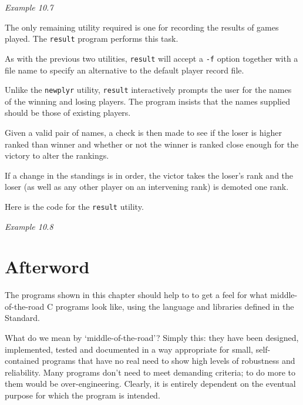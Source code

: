   \begin{center}\textit{Example 10.7}\end{center}


  The only remaining utility required is one for recording the results of
   games played. The \texttt{result} program performs this task.


  As with the previous two utilities, \texttt{result} will accept
   a \texttt{-f} option together with a file name to specify an alternative
   to the default player record file.


  Unlike the \texttt{newplyr} utility, \texttt{result} interactively
   prompts the user for the names of the winning and losing players. The
   program insists that the names supplied should be those of existing
   players.


  Given a valid pair of names, a check is then made to see if the loser is
   higher ranked than winner and whether or not the winner is ranked close
   enough for the victory to alter the rankings.


  If a change in the standings is in order, the victor takes the loser's
   rank and the loser (as well as any other player on an intervening rank) is
   demoted one rank.


  Here is the code for the \texttt{result} utility.


  \begin{center}\textit{Example 10.8}\end{center}

 
 
        \section{Afterword}
        

  

  The programs shown in this chapter should help to to get a feel for
   what middle-of-the-road C programs look like, using the language and
   libraries defined in the Standard.


  What do we mean by `middle-of-the-road'? Simply this: they have
   been designed, implemented, tested and documented in a way appropriate
   for small, self-contained programs that have no real need to show high
   levels of robustness and reliability. Many programs don't need to meet
   demanding criteria; to do more to them would be over-engineering.
   Clearly, it is entirely dependent on the eventual purpose for which the
   program is intended.


